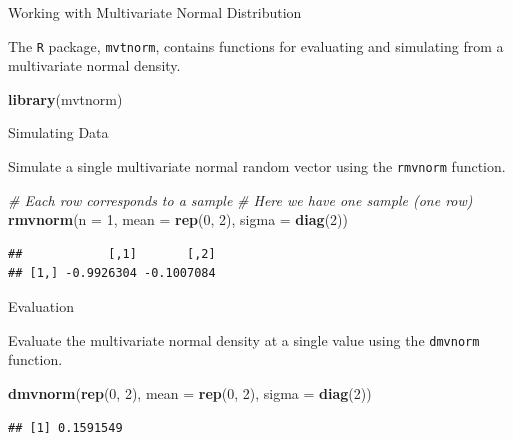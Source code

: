 \documentclass[
  ignorenonframetext,
]{beamer}
\newenvironment{Shaded}{\begin{snugshade}}{\end{snugshade}}
\newcommand{\CommentTok}[1]{\textcolor[rgb]{0.56,0.35,0.01}{\textit{#1}}}
\newcommand{\DataTypeTok}[1]{\textcolor[rgb]{0.13,0.29,0.53}{#1}}
\newcommand{\DecValTok}[1]{\textcolor[rgb]{0.00,0.00,0.81}{#1}}
\newcommand{\KeywordTok}[1]{\textcolor[rgb]{0.13,0.29,0.53}{\textbf{#1}}}
\newcommand{\NormalTok}[1]{#1}
\begin{document}
\begin{frame}[fragile]{Working with Multivariate Normal Distribution}
\protect\hypertarget{working-with-multivariate-normal-distribution}{}

The \texttt{R} package, \texttt{mvtnorm}, contains functions for
evaluating and simulating from a multivariate normal density.

\begin{Shaded}
\begin{Highlighting}[]
\KeywordTok{library}\NormalTok{(mvtnorm)}
\end{Highlighting}
\end{Shaded}

\end{frame}

\begin{frame}[fragile]{Simulating Data}
\protect\hypertarget{simulating-data}{}

Simulate a single multivariate normal random vector using the
\texttt{rmvnorm} function.

\begin{Shaded}
\begin{Highlighting}[]
\CommentTok{# Each row corresponds to a sample}
\CommentTok{# Here we have one sample (one row)}
\KeywordTok{rmvnorm}\NormalTok{(}\DataTypeTok{n =} \DecValTok{1}\NormalTok{, }\DataTypeTok{mean =} \KeywordTok{rep}\NormalTok{(}\DecValTok{0}\NormalTok{, }\DecValTok{2}\NormalTok{), }\DataTypeTok{sigma =} \KeywordTok{diag}\NormalTok{(}\DecValTok{2}\NormalTok{))}
\end{Highlighting}
\end{Shaded}

\begin{verbatim}
##            [,1]       [,2]
## [1,] -0.9926304 -0.1007084
\end{verbatim}

\end{frame}

\begin{frame}[fragile]{Evaluation}
\protect\hypertarget{evaluation}{}

Evaluate the multivariate normal density at a single value using the
\texttt{dmvnorm} function.

\begin{Shaded}
\begin{Highlighting}[]
\KeywordTok{dmvnorm}\NormalTok{(}\KeywordTok{rep}\NormalTok{(}\DecValTok{0}\NormalTok{, }\DecValTok{2}\NormalTok{), }\DataTypeTok{mean =} \KeywordTok{rep}\NormalTok{(}\DecValTok{0}\NormalTok{, }\DecValTok{2}\NormalTok{), }\DataTypeTok{sigma =} \KeywordTok{diag}\NormalTok{(}\DecValTok{2}\NormalTok{))}
\end{Highlighting}
\end{Shaded}

\begin{verbatim}
## [1] 0.1591549
\end{verbatim}

\end{frame}
\end{document}
